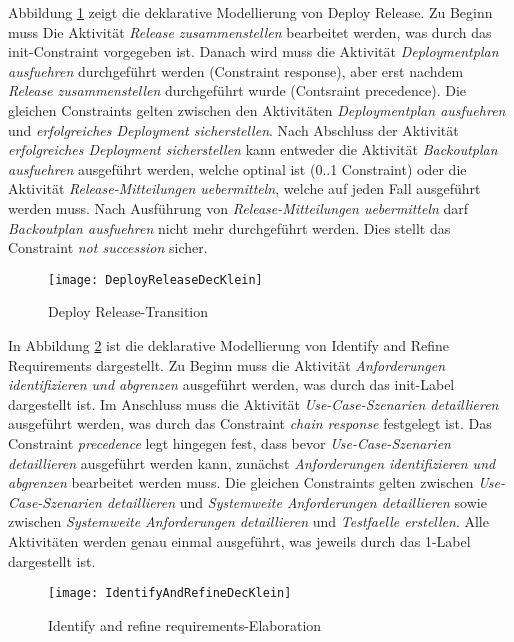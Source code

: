 Abbildung \ref{fig:DeployReleaseDecKlein} zeigt die deklarative Modellierung von Deploy Release.\newline
Zu Beginn muss Die Aktivität \textit{Release zusammenstellen} bearbeitet werden, was durch das init-Constraint vorgegeben ist. Danach wird muss die Aktivität \textit{Deploymentplan ausfuehren} durchgeführt werden (Constraint response), aber erst nachdem \textit{Release zusammenstellen} durchgeführt wurde (Contsraint precedence).\newline
Die gleichen Constraints gelten zwischen den Aktivitäten \textit{Deploymentplan ausfuehren} und \textit{erfolgreiches Deployment sicherstellen}.\newline
Nach Abschluss der Aktivität \textit{erfolgreiches Deployment sicherstellen} kann entweder die Aktivität \textit{Backoutplan ausfuehren} ausgeführt werden, welche optinal ist (0..1 Constraint) oder die Aktivität \textit{Release-Mitteilungen uebermitteln}, welche auf jeden Fall ausgeführt werden muss.\newline 
Nach Ausführung von \textit{Release-Mitteilungen uebermitteln} darf \textit{Backoutplan ausfuehren} nicht mehr durchgeführt werden. Dies stellt das Constraint \textit{not succession} sicher.
\begin{figure}[htp]
\begin{center}
  \texttt{[image: DeployReleaseDecKlein]} %
  \caption{Deploy Release-Transition}
  \label{fig:DeployReleaseDecKlein}
\end{center}
\end{figure}


In Abbildung \ref{fig:IdentifyAndRefineDecKlein} ist die deklarative Modellierung von Identify and Refine Requirements dargestellt.\newline
Zu Beginn muss die Aktivität \textit{Anforderungen identifizieren und abgrenzen} ausgeführt werden, was durch das init-Label dargestellt ist. Im Anschluss muss die Aktivität \textit{Use-Case-Szenarien detaillieren} ausgeführt werden, was durch das Constraint \textit{chain response} festgelegt ist. Das Constraint \textit{precedence} legt hingegen fest, dass bevor \textit{Use-Case-Szenarien detaillieren} ausgeführt werden kann, zunächst \textit{Anforderungen identifizieren und abgrenzen}  bearbeitet werden muss. Die gleichen Constraints gelten zwischen \textit{Use-Case-Szenarien detaillieren} und \textit{Systemweite Anforderungen detaillieren} sowie zwischen \textit{Systemweite Anforderungen detaillieren} und \textit{Testfaelle erstellen}. Alle Aktivitäten werden genau einmal ausgeführt, was jeweils durch das 1-Label dargestellt ist. 
\begin{figure}[h]
\begin{center}
  \texttt{[image: IdentifyAndRefineDecKlein]} %
  \caption{Identify and refine requirements-Elaboration}
  \label{fig:IdentifyAndRefineDecKlein}
\end{center}
\end{figure}



